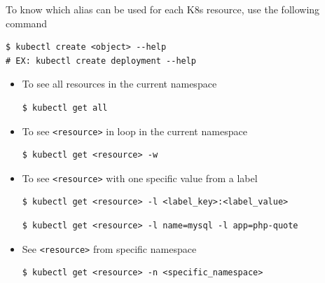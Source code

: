 \documentclass{article}
\newenvironment{blocktemplateII}[1]{%
    \tcolorbox[beamer,%
    noparskip,breakable,
    colframe=Green,%
    colbacklower=LimeGreen!75!LightGreen,%
    title=#1]}%
    {\endtcolorbox}
\newenvironment{codetemplate}[1][]{%
  \mybasecolorbox[#1]
  \itshape
}{%
  \endmybasecolorbox
}
\begin{document}
\begin{blocktemplateII}{NOTE}
To know which alias can be used for each K8s resource, use the following command
\begin{codetemplate}{}
\begin{verbatim}
$ kubectl create <object> --help
# EX: kubectl create deployment --help
\end{verbatim}
\end{codetemplate}
\end{blocktemplateII}

\begin{itemize}

    \item To see all resources in the current namespace
\begin{codetemplate}{}
\begin{verbatim}
$ kubectl get all
\end{verbatim}
\end{codetemplate}

    \item To see \verb|<resource>| in loop in the current namespace
\begin{codetemplate}{}
\begin{verbatim}
$ kubectl get <resource> -w
\end{verbatim}
\end{codetemplate}

    \item To see \verb|<resource>| with one specific value from a label
\begin{codetemplate}{}
\begin{verbatim}
$ kubectl get <resource> -l <label_key>:<label_value>
\end{verbatim}
\end{codetemplate}
\begin{codetemplate}{}
\begin{verbatim}
$ kubectl get <resource> -l name=mysql -l app=php-quote
\end{verbatim}
\end{codetemplate}

    \item See \verb|<resource>| from specific namespace
\begin{codetemplate}{}
\begin{verbatim}
$ kubectl get <resource> -n <specific_namespace>
\end{verbatim}
\end{codetemplate}


\end{itemize}
\end{document}
